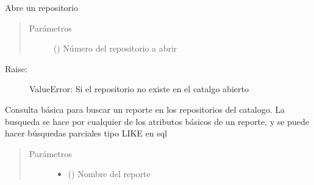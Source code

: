 \documentclass[a4paper,12pt,spanish]{sphinxmanual}
\begin{document}
\begin{fulllineitems}
\begin{fulllineitems}
\begin{itemize}
\end{itemize}

\end{fulllineitems}


\begin{fulllineitems}
\label{\detokenize{openerm.OermClient:openerm.OermClient.OermClient.open_repo}}
Abre un repositorio
\begin{quote}\begin{description}
\item[{Parámetros}] \leavevmode
{} () \textendash{} Número del repositorio a abrir

\end{description}\end{quote}
\begin{description}
\item[{Raise:}] \leavevmode
ValueError: Si el repositorio no existe en el catalgo abierto

\end{description}

\end{fulllineitems}


\begin{fulllineitems}
\label{\detokenize{openerm.OermClient:openerm.OermClient.OermClient.query_reports}}
Consulta básica para buscar un reporte en los repositorios del catalogo.
La busqueda se hace por cualquier de los atributos básicos de un reporte, y
se puede hacer búsquedas parciales tipo LIKE en sql
\begin{quote}\begin{description}
\item[{Parámetros}] \leavevmode\begin{itemize}
\item {} 
 () \textendash{} Nombre del reporte


\end{itemize}
\end{description}
\end{quote}
\end{fulllineitems}
\end{fulllineitems}
\end{document}

